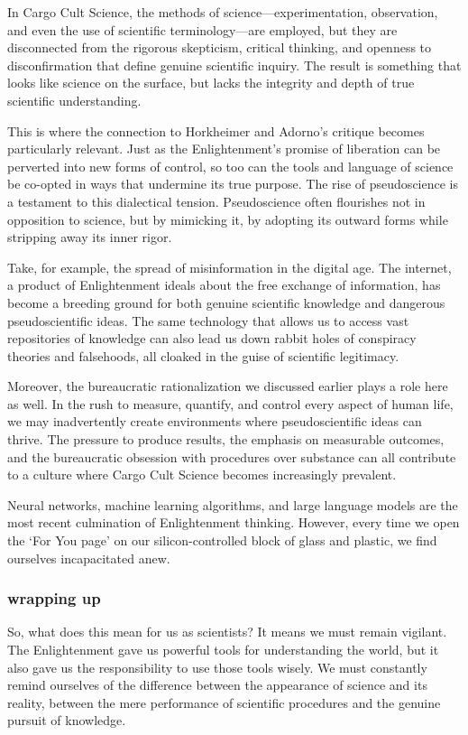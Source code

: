 In Cargo Cult Science, the methods of science—experimentation, observation, and
even the use of scientific terminology—are employed, but they are disconnected
from the rigorous skepticism, critical thinking, and openness to
disconfirmation that define genuine scientific inquiry. The result is something
that looks like science on the surface, but lacks the integrity and depth of
true scientific understanding.

This is where the connection to Horkheimer and Adorno's critique becomes
particularly relevant. Just as the Enlightenment's promise of liberation can be
perverted into new forms of control, so too can the tools and language of
science be co-opted in ways that undermine its true purpose. The rise of
pseudoscience is a testament to this dialectical tension. Pseudoscience often
flourishes not in opposition to science, but by mimicking it, by adopting its
outward forms while stripping away its inner rigor.

Take, for example, the spread of misinformation in the digital age. The
internet, a product of Enlightenment ideals about the free exchange of
information, has become a breeding ground for both genuine scientific knowledge
and dangerous pseudoscientific ideas. The same technology that allows us to
access vast repositories of knowledge can also lead us down rabbit holes of
conspiracy theories and falsehoods, all cloaked in the guise of scientific
legitimacy.

Moreover, the bureaucratic rationalization we discussed earlier plays a role
here as well. In the rush to measure, quantify, and control every aspect of
human life, we may inadvertently create environments where pseudoscientific
ideas can thrive. The pressure to produce results, the emphasis on measurable
outcomes, and the bureaucratic obsession with procedures over substance can all
contribute to a culture where Cargo Cult Science becomes increasingly
prevalent.

Neural networks, machine learning algorithms, and large language models are the
most recent culmination of Enlightenment thinking. However, every time we open
the ‘For You page’ on our silicon-controlled block of glass and plastic, we
find ourselves incapacitated anew.

\subsubsection*{wrapping up}
So, what does this mean for us as scientists? It means we must remain vigilant.
The Enlightenment gave us powerful tools for understanding the world, but it
also gave us the responsibility to use those tools wisely. We must constantly
remind ourselves of the difference between the appearance of science and its
reality, between the mere performance of scientific procedures and the genuine
pursuit of knowledge.

